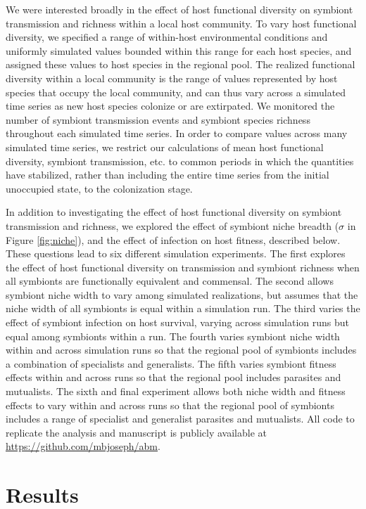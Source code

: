 \documentclass[12pt]{article}
\begin{document}
We were interested broadly in the effect of host functional diversity on symbiont transmission and richness within a local host community.
To vary host functional diversity, we specified a range of within-host environmental conditions and uniformly simulated values bounded within this range for each host species, and assigned these values to host species in the regional pool. 
The realized functional diversity within a local community is the range of values represented by host species that occupy the local community, and can thus vary across a simulated time series as new host species colonize or are extirpated. 
We monitored the number of symbiont transmission events and symbiont species richness throughout each simulated time series. 
In order to compare values across many simulated time series, we restrict our calculations of mean host functional diversity, symbiont transmission, etc. to common periods in which the quantities have stabilized, rather than including the entire time series from the initial unoccupied state, to the colonization stage. 

In addition to investigating the effect of host functional diversity on symbiont transmission and richness, we explored the effect of symbiont niche breadth ($\sigma$ in Figure \ref{fig:niche}), and the effect of infection on host fitness, described below. 
These questions lead to six different simulation experiments. 
The first explores the effect of host functional diversity on transmission and symbiont richness when all symbionts are functionally equivalent and commensal.
The second allows symbiont niche width to vary among simulated realizations, but assumes that the niche width of all symbionts is equal within a simulation run. 
The third varies the effect of symbiont infection on host survival, varying across simulation runs but equal among symbionts within a run. 
The fourth varies symbiont niche width within and across simulation runs so that the regional pool of symbionts includes a combination of specialists and generalists.
The fifth varies symbiont fitness effects within and across runs so that the regional pool includes parasites and mutualists.
The sixth and final experiment allows both niche width and fitness effects to vary within and across runs so that the regional pool of symbionts includes a range of specialist and generalist parasites and mutualists. 
All code to replicate the analysis and manuscript is publicly available at \url{https://github.com/mbjoseph/abm}.

\section*{Results}
\end{document}

